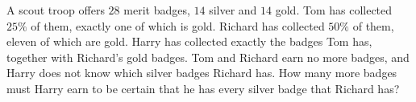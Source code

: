 A scout troop offers $28$ merit badges, $14$ silver and $14$ gold. Tom has collected $25\%$ of them, exactly one of which is gold. Richard has collected $50\%$ of them, eleven of which are gold. Harry has collected exactly the badges Tom has, together with Richard's gold badges. Tom and Richard earn no more badges, and Harry does not know which silver badges Richard has. How many more badges must Harry earn to be certain that he has every silver badge that Richard has?
